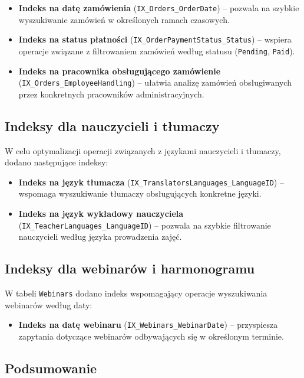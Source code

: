 \documentclass[12pt]{article}
\begin{document}
\begin{itemize}
    \item \textbf{Indeks na datę zamówienia} (\texttt{IX\_Orders\_OrderDate}) -- pozwala na szybkie wyszukiwanie zamówień w określonych ramach czasowych.
    \item \textbf{Indeks na status płatności} (\texttt{IX\_OrderPaymentStatus\_Status}) -- wspiera operacje związane z filtrowaniem zamówień według statusu (\texttt{Pending}, \texttt{Paid}).
    \item \textbf{Indeks na pracownika obsługującego zamówienie} (\texttt{IX\_Orders\_EmployeeHandling}) -- ułatwia analizę zamówień obsługiwanych przez konkretnych pracowników administracyjnych.
\end{itemize}

\subsection{Indeksy dla nauczycieli i tłumaczy}

\noindent W celu optymalizacji operacji związanych z językami nauczycieli i tłumaczy, dodano następujące indeksy:

\begin{itemize}
    \item \textbf{Indeks na język tłumacza} (\texttt{IX\_TranslatorsLanguages\_LanguageID}) -- wspomaga wyszukiwanie tłumaczy obsługujących konkretne języki.
    \item \textbf{Indeks na język wykładowy nauczyciela} (\texttt{IX\_TeacherLanguages\_LanguageID}) -- pozwala na szybkie filtrowanie nauczycieli według języka prowadzenia zajęć.
\end{itemize}

\subsection{Indeksy dla webinarów i harmonogramu}

\noindent W tabeli \texttt{Webinars} dodano indeks wspomagający operacje wyszukiwania webinarów według daty:

\begin{itemize}
    \item \textbf{Indeks na datę webinaru} (\texttt{IX\_Webinars\_WebinarDate}) -- przyspiesza zapytania dotyczące webinarów odbywających się w określonym terminie.
\end{itemize}

\subsection{Podsumowanie}
\end{document}
